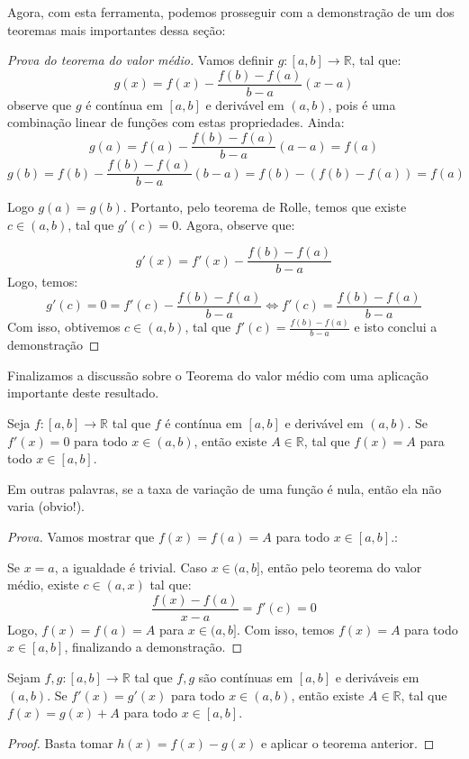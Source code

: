 	Agora, com esta ferramenta, podemos prosseguir com a demonstração de um dos teoremas mais importantes dessa seção:
	
	\begin{proof}[Prova do teorema do valor médio]
		Vamos definir $g:[a,b]\to\mathbb{R}$, tal que:
		$$g(x) = f(x) - \frac{f(b) - f(a)}{b-a}(x-a)$$
		observe que $g$ é contínua em $[a,b]$ e derivável em $(a,b)$, pois é uma combinação linear de funções com estas propriedades. Ainda:
		$$g(a)= f(a) - \frac{f(b) - f(a)}{b-a}(a-a) = f(a)$$
		$$g(b)= f(b) - \frac{f(b) - f(a)}{b-a}(b-a) = f(b) - (f(b)-f(a)) = f(a)$$
		
		Logo $g(a)=g(b)$. Portanto, pelo teorema de Rolle, temos que existe $c\in(a,b)$, tal que $g'(c)=0$. Agora, observe que:
		
		$$g'(x) = f'(x) - \frac{f(b) - f(a)}{b-a}$$
		Logo, temos:
		$$g'(c)= 0 = f'(c) - \frac{f(b) - f(a)}{b-a} \iff f'(c) = \frac{f(b) - f(a)}{b-a}$$
		Com isso, obtivemos $c\in (a,b)$, tal que $f'(c) = \frac{f(b) - f(a)}{b-a}$ e isto conclui a demonstração
	\end{proof}
	
	Finalizamos a discussão sobre o Teorema do valor médio com uma aplicação importante deste resultado.
	\begin{teo}
		Seja $f:[a,b]\to \mathbb{R}$ tal que $f$ é contínua em $[a,b]$ e derivável em $(a,b)$. Se $f'(x)=0$ para todo $x\in(a,b)$, então existe $A\in\mathbb{R}$, tal que $f(x)=A$ para todo $x\in[a,b]$. 
	\end{teo}
	Em outras palavras, se a taxa de variação de uma função é nula, então ela não varia (obvio!).
	
	\begin{proof}[Prova]
		Vamos mostrar que $f(x) = f(a) = A$ para todo $x\in[a,b]$.:
		
		 Se $x=a$, a igualdade é trivial. Caso $x\in(a,b]$, então pelo teorema do valor médio, existe $c\in(a,x)$ tal que:
		 $$\frac{f(x) - f(a)}{x-a} = f'(c) = 0$$
		 Logo, $f(x) = f(a) = A$ para $x\in(a,b]$. Com isso, temos $f(x)= A$ para todo $x\in[a,b]$, finalizando a demonstração.
		
	\end{proof}
	
	\begin{cor}
		Sejam $f,g:[a,b]\to \mathbb{R}$ tal que $f,g$ são contínuas em $[a,b]$ e deriváveis em $(a,b)$. Se $f'(x)= g'(x)$ para todo $x\in(a,b)$, então existe $A\in\mathbb{R}$, tal que $f(x) = g(x)+ A$ para todo $x\in[a,b]$.
	\end{cor}
	\begin{proof}
		Basta tomar $h(x) = f(x)-g(x)$ e aplicar o teorema anterior.
	\end{proof}

